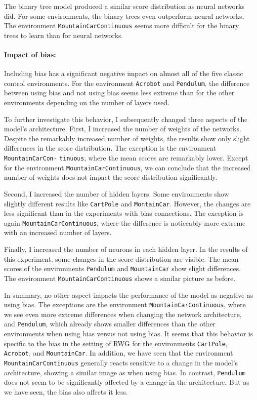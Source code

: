 The binary tree model produced a similar score distribution as neural networks did. For some environments, the binary trees even outperform neural networks. The environment \verb|MountainCarContinuous| seems more difficult for the binary trees to learn than for neural networks.

\paragraph*{Impact of bias:} Including bias has a significant negative impact on almost all of the five classic control environments. For the environment \verb|Acrobot| and \verb|Pendulum|, the difference between using bias and not using bias seems less extreme than for the other environments depending on the number of layers used.

To further investigate this behavior, I subsequently changed three aspects of the model's architecture. First, I increased the number of weights of the networks. Despite the remarkably increased number of weights, the results show only slight differences in the score distribution. The exception is the environment \texttt{MountainCarCon-} \texttt{tinuous}, where the mean scores are remarkably lower. Except for the environment \texttt{MountainCarContinuous}, we can conclude that the increased number of weights does not impact the score distribution significantly.

Second, I increased the number of hidden layers. Some environments show slightly different results like \verb|CartPole| and \verb|MontainCar|. However, the changes are less significant than in the experiments with bias connections. The exception is again \verb|MountainCarContinuous|, where the difference is noticeably more extreme with an increased number of layers.

Finally, I increased the number of neurons in each hidden layer. In the results of this experiment, some changes in the score distribution are visible. The mean scores of the environments \verb|Pendulum| and \verb|MountainCar| show slight differences. The environment \verb|MountainCarContinuous| shows a similar picture as before.

In summary, no other aspect impacts the performance of the model as negative as using bias. The exceptions are the environment \verb|MountainCarContinuous|, where we see even more extreme differences when changing the network architecture, and \verb|Pendulum|, which already shows smaller differences than the other environments when using bias versus not using bias. It seems that this behavior is specific to the bias in the setting of RWG for the environments \verb|CartPole|, \verb|Acrobot|, and \verb|MountainCar|. In addition, we have seen that the environment \verb|MountainCarContinuous| generally reacts sensitive to a change in the model's architecture, showing a similar image as when using bias. In contrast, \verb|Pendulum| does not seem to be significantly affected by a change in the architecture. But as we have seen, the bias also affects it less.
